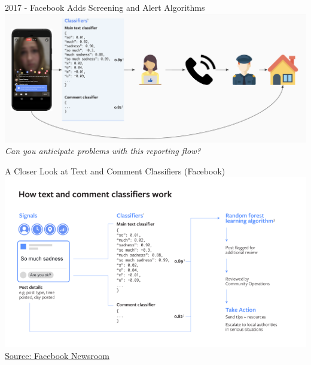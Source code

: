 \documentclass[nobackground,dvipsnames,table,aspectratio=169]{beamer}
\begin{document}
\begin{frame}{2017 - Facebook Adds Screening and Alert Algorithms}
    \includegraphics[width=\textwidth]{potentially-problematic-reporting-flow}
    \centering
    \small
    \textit{Can you anticipate problems with this reporting flow?}
\end{frame}

\begin{frame}{A Closer Look at Text and Comment Classifiers (Facebook)}
    \includegraphics[width=\textwidth]{text-and-comment-classifiers}
    \small
    \href{https://about.fb.com/news/2018/09/inside-feed-suicide-prevention-and-ai/}{Source: Facebook Newsroom}
\end{frame}
\end{document}

